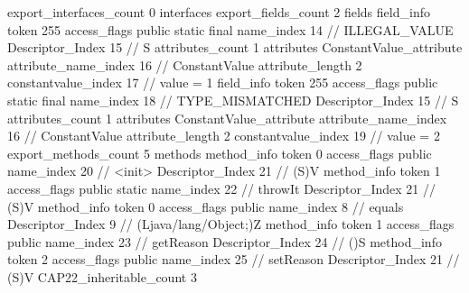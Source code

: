 {{{{			}
			export_interfaces_count	0
			interfaces {
			}
			export_fields_count	2
			fields {
			field_info {
				token	255
				access_flags	public static final
				name_index	14		// ILLEGAL_VALUE
				Descriptor_Index	15		// S
				attributes_count	1
				attributes {
				ConstantValue_attribute {
					attribute_name_index	16		// ConstantValue
					attribute_length	2
					constantvalue_index	17		// value = 1
				}
				}
			}
			field_info {
				token	255
				access_flags	public static final
				name_index	18		// TYPE_MISMATCHED
				Descriptor_Index	15		// S
				attributes_count	1
				attributes {
				ConstantValue_attribute {
					attribute_name_index	16		// ConstantValue
					attribute_length	2
					constantvalue_index	19		// value = 2
				}
				}
			}
			}
			export_methods_count	5
			methods {
				method_info {
					token	0
					access_flags	public
					name_index	20		// <init>
					Descriptor_Index	21		// (S)V
				}
				method_info {
					token	1
					access_flags	public static
					name_index	22		// throwIt
					Descriptor_Index	21		// (S)V
				}
				method_info {
					token	0
					access_flags	public
					name_index	8		// equals
					Descriptor_Index	9		// (Ljava/lang/Object;)Z
				}
				method_info {
					token	1
					access_flags	public
					name_index	23		// getReason
					Descriptor_Index	24		// ()S
				}
				method_info {
					token	2
					access_flags	public
					name_index	25		// setReason
					Descriptor_Index	21		// (S)V
				}
			}
			CAP22_inheritable_count	3
		}
	}
}
